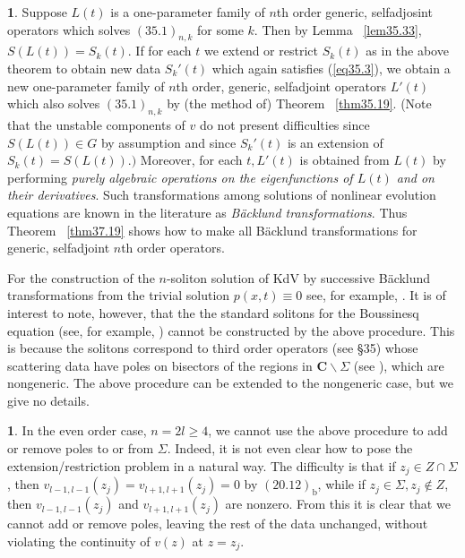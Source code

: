 \documentclass{surv-l}
\theoremstyle{plain}
\theoremstyle{definition}
\newtheorem{remark}[theorem]{\sc{Remark}}
\numberwithin{equation}{chapter}
\begin{document}
\begin{remark}\label{rem37.50}
Suppose $L(t)$ is a one-parameter family of $n$th order generic, selfadjosint operators which solves $\mathrm{(35.1)}_{n,k}$ for some $k$. Then by Lemma ~\ref{lem35.33}, $S(L(t))=S_{k}(t)$. If for each $t$ we extend or restrict $S_{k}(t)$ as in the above theorem to obtain new data $S_{k}'(t)$ which again satisfies (\ref{eq35.3}), we obtain a new one-parameter family of $n$th order, generic, selfadjoint operators $L'(t)$ which also solves $\mathrm{(35.1)}_{n,k}$ by (the method of) Theorem ~\ref{thm35.19}. (Note that the unstable components of $v$ do not present difficulties since $S(L(t))\in G$ by assumption and since $S_{k}'(t)$ is an extension of $S_{k}(t)=S(L(t)).)$ Moreover, for each $t, L'(t)$ is obtained from $L(t)$ by performing \emph{purely algebraic operations on the eigenfunctions of $L(t)$ and on their derivatives}. Such transformations among solutions of nonlinear evolution equations are known in the literature as \emph{B\"{a}cklund transformations}. Thus Theorem ~\ref{thm37.19} shows how to make all B\"{a}cklund transformations for generic, selfadjoint $n$th order operators.
\end{remark}

For the construction of the $n$-soliton solution of KdV by successive B\"{a}cklund transformations from the trivial solution $p(x, t)\equiv 0$ see, for example, \cite{DT}. It is of interest to note, however, that the the standard solitons for the Boussinesq equation (see, for example, \cite{SCM}) cannot be constructed by the above procedure. This is because the solitons correspond to third order operators (see \S35) whose scattering data have poles on bisectors of the regions in $ \mathrm{\textbf{C}}\backslash \Sigma$ (see \cite{DTT}), which are nongeneric. The above procedure can be extended to the nongeneric case, but we give no details.

\begin{remark}\label{rem37.51}
In the even order case, $n=2l\geq 4$, we cannot use the above procedure to add or remove poles to or from $\Sigma$. Indeed, it is not even clear how to pose the extension/restriction problem in a natural way. The difficulty is that if $ z_{j}\in Z\cap\Sigma$, then $v_{l-1,l-1}(z_{j})=v_{l+1,l+1}(z_{j})=0$ by $\mathrm{(20.12)_{b}}$, while if $ z_{j}\in\Sigma, z_{j}\not\in Z$, then $v_{l-1,l-1}(z_{j})$ and $v_{l+1,l+1}(z_{j})$ are nonzero. From this it is clear that we cannot add or remove poles, leaving the rest of the data unchanged, without violating the continuity of $v(z)$ at $z=z_{j}$.
\end{remark}
\end{document}
